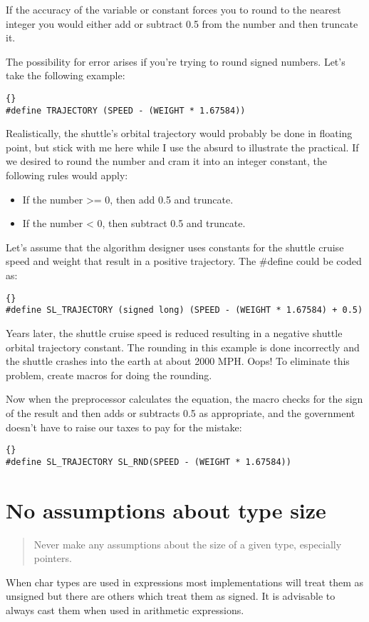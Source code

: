 \documentclass{report}
\begin{document}
If the accuracy of the variable or constant forces you to round to the nearest integer you would either add or subtract 0.5 from the number and then truncate it.

The possibility for error arises if you're trying to round signed numbers. Let's take the following example: 
\begin{lstlisting}{}
#define TRAJECTORY (SPEED - (WEIGHT * 1.67584))
\end{lstlisting}
Realistically, the shuttle's orbital trajectory would probably be done in floating point, but stick with me here while I use the absurd to illustrate the practical. If we desired to round the number and cram it into an integer constant, the following rules would apply:
\begin{itemize}
\item If the number >= 0, then add 0.5 and truncate.
\item If the number < 0, then subtract 0.5 and truncate.
\end{itemize}
Let's assume that the algorithm designer uses constants for the shuttle cruise speed and weight that result in a positive trajectory. The \#define could be coded as: 
\begin{lstlisting}{}
#define SL_TRAJECTORY (signed long) (SPEED - (WEIGHT * 1.67584) + 0.5)
\end{lstlisting}
Years later, the shuttle cruise speed is reduced resulting in a negative shuttle orbital trajectory constant. The rounding in this example is done incorrectly and the shuttle crashes into the earth at about 2000 MPH. Oops! To eliminate this problem, create macros for doing the rounding.

Now when the preprocessor calculates the equation, the macro checks for the sign of the result and then adds or subtracts 0.5 as appropriate, and the government doesn't have to raise our taxes to pay for the mistake: 
\begin{lstlisting}{}
#define SL_TRAJECTORY SL_RND(SPEED - (WEIGHT * 1.67584))
\end{lstlisting}

\section{No assumptions about type size}
\begin{quote}
Never make any assumptions about the size of a given type, especially pointers.
\end{quote}
When char types are used in expressions most implementations will treat them as unsigned but there are others which treat them as signed. It is advisable to always cast them when used in arithmetic expressions.
\end{document}

